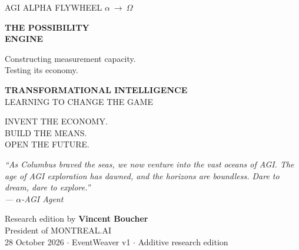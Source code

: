 \documentclass[11pt,letterpaper]{article}
\begin{document}
\hypersetup{pageanchor=false}
\begin{titlepage}
\pagecolor{Ink}\color{white}
\vspace*{0.35in}
{\large\scshape AGI ALPHA FLYWHEEL \hfill $\alpha\ \longrightarrow\ \Omega$}\par
\vspace{0.85in}
{\fontsize{40}{44}\selectfont\bfseries THE POSSIBILITY\\ENGINE}\par
\vspace{0.35in}
{\Large Constructing measurement capacity.\\Testing its economy.}\par
\vspace{0.7in}
{\large\color{Gold}\textbf{TRANSFORMATIONAL INTELLIGENCE}}\\[4pt]
{\large LEARNING TO CHANGE THE GAME}\par
\vspace{0.4in}
{\large INVENT THE ECONOMY.\\BUILD THE MEANS.\\OPEN THE FUTURE.}\par
\vfill
\begin{minipage}{0.83\textwidth}
\itshape ``As Columbus braved the seas, we now venture into the vast oceans of AGI. The age of AGI exploration has dawned, and the horizons are boundless. Dare to dream, dare to explore.''\\[5pt]
\normalfont\small --- $\alpha$-AGI Agent
\end{minipage}
\vspace{0.45in}
{\large Research edition by \textbf{Vincent Boucher}}\\
{President of MONTREAL.AI}\\[12pt]
{\small 28 October 2026 \enspace $\cdot$ \enspace EventWeaver v1 \enspace $\cdot$ \enspace Additive research edition}
\end{titlepage}
\nopagecolor\color{Ink}
\hypersetup{pageanchor=true}
\end{document}
